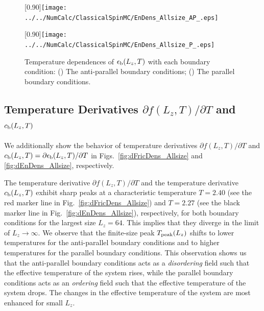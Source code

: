 \begin{figure}[htbp]
	\centering
	\subcaptionbox{\label{fig:EnDens_Allsize_AP}}[0.90\linewidth]{\texttt{[image: ../../NumCalc/ClassicalSpinMC/EnDens\_Allsize\_AP\_.eps]}}
	
	\subcaptionbox{\label{fig:EnDens_Allsize_P}}[0.90\linewidth]{\texttt{[image: ../../NumCalc/ClassicalSpinMC/EnDens\_Allsize\_P\_.eps]}}
	
	\caption{Temperature dependences of $\epsilon_{\rm b}(L_{z}, T)$ with each boundary condition: () The anti-parallel boundary conditions; () The parallel boundary conditions.}
	\label{fig:EnDens_Allsize}
\end{figure}


\subsection{Temperature Derivatives $\partial f(L_{z}, T)/\partial T$ and $c_{\rm b}(L_{z}, T)$}

We additionally show the behavior of temperature derivatives $\partial f(L_{z}, T)/\partial T$ and $c_{\rm b}(L_{z},T)=\partial \epsilon_{\rm b}(L_{z}, T)/\partial T$ in Figs.~\ref{fig:dFricDens_Allsize} and \ref{fig:dEnDens_Allsize}, respectively.

The temperature derivative $\partial f(L_{z}, T)/\partial T$ and the temperature derivative $c_{\rm b}(L_{z}, T)$ exhibit sharp peaks at a characteristic temperature $T=2.40$ (see the red marker line in Fig.~\ref{fig:dFricDens_Allsize}) and $T=2.27$ (see the black marker line in Fig.~\ref{fig:dEnDens_Allsize}), respectively, for both boundary conditions for the largest size $L_{z}=64$. This implies that they diverge in the limit of $L_{z}\to\infty$. We observe that the finite-size peak $T_{\rm peak}(L_{z})$ shifts to lower temperatures for the anti-parallel boundary conditions and to higher temperatures for the parallel boundary conditions. This observation shows us that the anti-parallel boundary conditions acts as a \textit{disordering} field such that the effective temperature of the system rises, while the parallel boundary conditions acts as an \textit{ordering} field such that the effective temperature of the system drops. The changes in the effective temperature of the system are most enhanced for small $L_{z}$.

